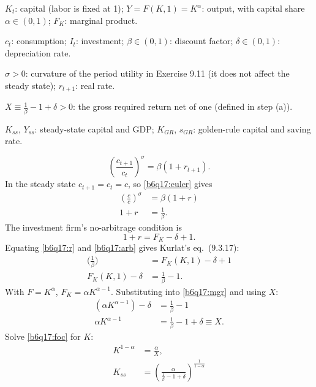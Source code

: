 \begin{sol}
\begin{notacao}
\item $K_t$: capital (labor is fixed at 1); $Y=F(K,1)=K^\alpha$: output, with capital share $\alpha\in(0,1)$; $F_K$: marginal product.
\item $c_t$: consumption; $I_t$: investment; $\beta\in(0,1)$: discount factor; $\delta\in(0,1)$: depreciation rate.
\item $\sigma>0$: curvature of the period utility in Exercise 9.11 (it does not affect the steady state); $r_{t+1}$: real rate.
\item $X\equiv\frac1\beta-1+\delta>0$: the gross required return net of one (defined in step (a)).
\item $K_{ss}$, $Y_{ss}$: steady-state capital and GDP; $K_{GR}$, $s_{GR}$: golden-rule capital and saving rate.
\end{notacao}
\begin{equation}
\left(\frac{c_{t+1}}{c_t}\right)^{\sigma}=\beta(1+r_{t+1}). \label{b6q17:euler}
\end{equation}
In the steady state $c_{t+1}=c_t=c$, so \eqref{b6q17:euler} gives
\begin{align}
\left(\frac{c}{c}\right)^{\sigma}&=\beta(1+r)\nonumber\\
1+r&=\frac1\beta. \label{b6q17:r}
\end{align}
The investment firm's no-arbitrage condition is
\begin{equation}
1+r=F_K-\delta+1. \label{b6q17:arb}
\end{equation}
Equating \eqref{b6q17:r} and \eqref{b6q17:arb} gives Kurlat's eq.~(9.3.17):
\begin{align}
\Big(\frac1\beta\Big)&=F_K(K,1)-\delta+1\nonumber\\
F_K(K,1)-\delta&=\frac1\beta-1. \label{b6q17:mgr}
\end{align}
With $F=K^\alpha$, $F_K=\alpha K^{\alpha-1}$. Substituting into \eqref{b6q17:mgr} and using $X$:
\begin{align}
(\alpha K^{\alpha-1})-\delta&=\frac1\beta-1\nonumber\\
\alpha K^{\alpha-1}&=\frac1\beta-1+\delta\equiv X. \label{b6q17:foc}
\end{align}
Solve \eqref{b6q17:foc} for $K$:
\begin{align}
K^{1-\alpha}&=\frac{\alpha}{X},\nonumber\\
K_{ss}&=\left(\frac{\alpha}{\frac1\beta-1+\delta}\right)^{\frac1{1-\alpha}} \label{b6q17:Kss}\\

\end{align}
\end{sol}
